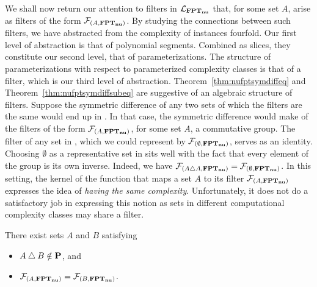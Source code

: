 We shall now return our attention to filters in $\mathcal{L}_{\textnormal{\textbf{FPT$_\textbf{nu}$}}}$ that, for some set $A$, arise as filters of the form $\mathcal{F}_{(A, \textnormal{\textbf{FPT$_\textbf{nu}$}})}$.
By studying the connections between such filters, we have abstracted from the complexity of instances fourfold.
Our first level of abstraction is that of polynomial segments.
Combined as slices, they constitute our second level, that of parameterizations.
The structure of parameterizations with respect to parameterized complexity classes is that of a filter, which is our third level of abstraction.
Theorem~\ref{thm:nufptsymdiffeq} and Theorem~\ref{thm:nufptsymdiffsubeq} are suggestive of an algebraic structure of filters.
Suppose the symmetric difference of any two sets of which the filters are the same would end up in .
In that case, the symmetric difference would make of the filters of the form $\mathcal{F}_{(A, \textnormal{\textbf{FPT$_\textbf{nu}$}})}$, for some set $A$, a commutative group.
The filter of any set in , which we could represent by $\mathcal{F}_{(\emptyset, \textnormal{\textbf{FPT$_\textbf{nu}$}})}$, serves as an identity.
Choosing $\emptyset$ as a representative set in  sits well with the fact that every element of the group is its own inverse.
Indeed, we have $\mathcal{F}_{(A \bigtriangleup A, \textnormal{\textbf{FPT$_\textbf{nu}$}})} = \mathcal{F}_{(\emptyset, \textnormal{\textbf{FPT$_\textbf{nu}$}})}$.
In this setting, the kernel of the function that maps a set $A$ to its filter $\mathcal{F}_{(A, \textnormal{\textbf{FPT$_\textbf{nu}$}})}$ expresses the idea of \emph{having the same complexity}.
Unfortunately, it does not do a satisfactory job in expressing this notion as sets in different computational complexity classes may share a filter.
\begin{theorem}
\label{thm:nufptsymdiff}
  There exist sets $A$ and $B$ satisfying
  \begin{itemize}
  \item $A \bigtriangleup B \notin \textnormal{\textbf{P}}$, and
  \item $\mathcal{F}_{(A, \textnormal{\textbf{FPT$_\textbf{nu}$}})} = \mathcal{F}_{(B, \textnormal{\textbf{FPT$_\textbf{nu}$}})}$.
  \end{itemize}
\end{theorem}
